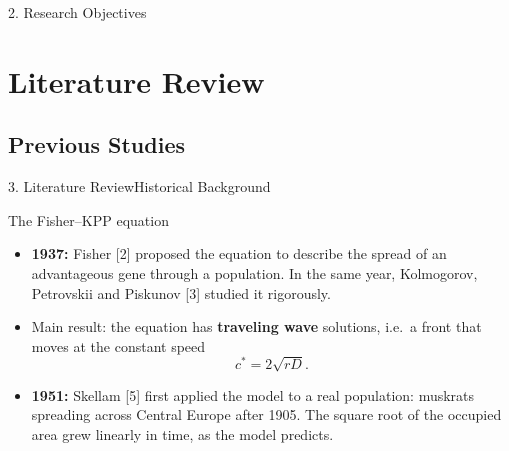 \documentclass[10pt]{beamer}
\begin{document}
\begin{frame}{2. Research Objectives}
\begin{center}
      \end{center}
    \end{frame}

\section{Literature Review}
  \subsection{Previous Studies}
    \begin{frame}{3. Literature Review}{Historical Background}
      \begin{block}{The Fisher--KPP equation}
          \begin{itemize}
              \item \textbf{1937:} Fisher [2] proposed the equation to describe the spread of an advantageous gene through a population. In the same year, Kolmogorov, Petrovskii and Piskunov [3] studied it rigorously.
              \item Main result: the equation has \textbf{traveling wave} solutions, i.e.\ a front that moves at the constant speed
              $$
              c^{*} = 2\sqrt{rD}.
              $$
              \item \textbf{1951:} Skellam [5] first applied the model to a real population: muskrats spreading across Central Europe after 1905. The square root of the occupied area grew linearly in time, as the model predicts.
          \end{itemize}
      \end{block}
    \end{frame}
\end{document}
